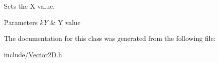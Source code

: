 Sets the X value. 


\begin{DoxyParams}{Parameters}
{\em k\+Y} & Y value \\
\hline
\end{DoxyParams}


The documentation for this class was generated from the following file\+:\begin{DoxyCompactItemize}
\item 
include/\hyperlink{_vector2_d_8h}{Vector2\+D.\+h}\end{DoxyCompactItemize}
